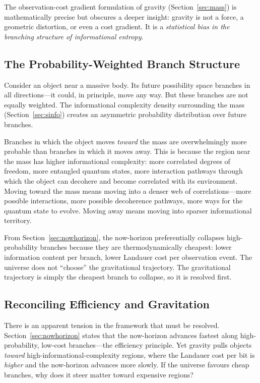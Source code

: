 \documentclass[12pt,a4paper]{article}
\begin{document}
The observation-cost gradient formulation of gravity (Section~\ref{sec:mass}) is mathematically precise but obscures a deeper insight: gravity is not a force, a geometric distortion, or even a cost gradient. It is a \emph{statistical bias in the branching structure of informational entropy}.

\subsection{The Probability-Weighted Branch Structure}

Consider an object near a massive body. Its future possibility space branches in all directions---it could, in principle, move any way. But these branches are not equally weighted. The informational complexity density surrounding the mass (Section~\ref{sec:sinfo}) creates an asymmetric probability distribution over future branches.

Branches in which the object moves \emph{toward} the mass are overwhelmingly more probable than branches in which it moves away. This is because the region near the mass has higher informational complexity: more correlated degrees of freedom, more entangled quantum states, more interaction pathways through which the object can decohere and become correlated with its environment. Moving toward the mass means moving into a denser web of correlations---more possible interactions, more possible decoherence pathways, more ways for the quantum state to evolve. Moving away means moving into sparser informational territory.

From Section~\ref{sec:nowhorizon}, the now-horizon preferentially collapses high-probability branches because they are thermodynamically cheapest: lower information content per branch, lower Landauer cost per observation event. The universe does not ``choose'' the gravitational trajectory. The gravitational trajectory is simply the cheapest branch to collapse, so it is resolved first.

\subsection{Reconciling Efficiency and Gravitation}

There is an apparent tension in the framework that must be resolved. Section~\ref{sec:nowhorizon} states that the now-horizon advances fastest along high-probability, low-cost branches---the efficiency principle. Yet gravity pulls objects \emph{toward} high-informational-complexity regions, where the Landauer cost per bit is \emph{higher} and the now-horizon advances more slowly. If the universe favours cheap branches, why does it steer matter toward expensive regions?
\end{document}
